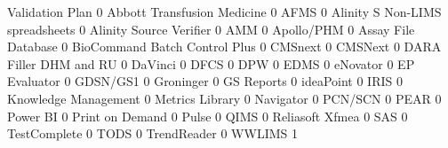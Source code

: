 \documentclass{article}
\begin{document}
\begin{Schunk}
\begin{Soutput}
                                  Validation Plan
                                                0
  Abbott Transfusion Medicine                   0
  AFMS                                          0
  Alinity S Non-LIMS spreadsheets               0
  Alinity Source Verifier                       0
  AMM                                           0
  Apollo/PHM                                    0
  Assay File Database                           0
  BioCommand Batch Control Plus                 0
  CMSnext                                       0
  CMSNext                                       0
  DARA Filler DHM and RU                        0
  DaVinci                                       0
  DFCS                                          0
  DPW                                           0
  EDMS                                          0
  eNovator                                      0
  EP Evaluator                                  0
  GDSN/GS1                                      0
  Groninger                                     0
  GS Reports                                    0
  ideaPoint                                     0
  IRIS                                          0
  Knowledge Management                          0
  Metrics Library                               0
  Navigator                                     0
  PCN/SCN                                       0
  PEAR                                          0
  Power BI                                      0
  Print on Demand                               0
  Pulse                                         0
  QIMS                                          0
  Reliasoft Xfmea                               0
  SAS                                           0
  TestComplete                                  0
  TODS                                          0
  TrendReader                                   0
  WWLIMS                                        1
\end{Soutput}
\end{Schunk}
\end{document}
